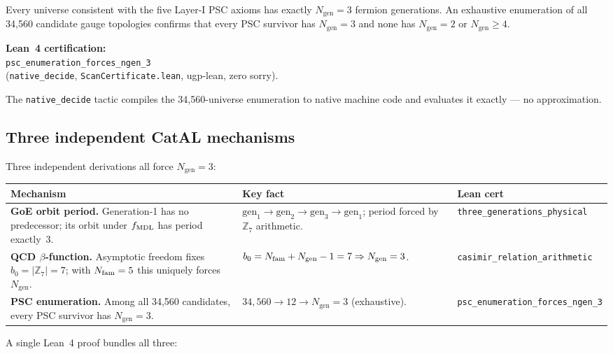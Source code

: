 \documentclass[11pt,a4paper]{article}
\newcommand{\lean}[1]{\texttt{#1}}
\newcommand{\ZS}{\mathbb{Z}_7}
\newcommand{\Ngen}{N_{\mathrm{gen}}}
\begin{document}
\begin{tcolorbox}[colback=boxpurple,colframe=purple!60!black,
  title={Theorem: Three-Generation Uniqueness (machine-certified)}]
Every universe consistent with the five Layer-I PSC axioms has exactly
$\Ngen = 3$ fermion generations.  An exhaustive enumeration of all 34,560
candidate gauge topologies confirms that every PSC survivor has $\Ngen = 3$
and none has $\Ngen = 2$ or $\Ngen \geq 4$.

\smallskip
\textbf{Lean~4 certification:}\\
\lean{psc\_enumeration\_forces\_ngen\_3}\\
(\lean{native\_decide}, \lean{ScanCertificate.lean}, ugp-lean, zero sorry).

The \lean{native\_decide} tactic compiles the 34,560-universe enumeration
to native machine code and evaluates it exactly --- no approximation.
\end{tcolorbox}

\subsection{Three independent CatAL mechanisms}

Three independent derivations all force $\Ngen = 3$:

\bigskip
\begin{center}
\small
\begin{tabular}{p{4.2cm}p{4.8cm}l}
\toprule
\textbf{Mechanism} & \textbf{Key fact} & \textbf{Lean cert} \\
\midrule
\textbf{GoE orbit period.}
Generation-1 has no predecessor; its orbit under $f_{\rm MDL}$
has period exactly~3. &
$\text{gen}_1 \to \text{gen}_2 \to \text{gen}_3 \to \text{gen}_1$;
period forced by $\ZS$ arithmetic. &
\lean{three\_generations\_physical} \\[8pt]
\textbf{QCD $\beta$-function.}
Asymptotic freedom fixes $b_0 = |\ZS| = 7$; with $N_{\rm fam}=5$ this
uniquely forces $\Ngen$. &
$b_0 = N_{\rm fam} + \Ngen - 1 = 7 \Rightarrow \Ngen = 3$. &
\lean{casimir\_relation\_arithmetic} \\[8pt]
\textbf{PSC enumeration.}
Among all 34,560 candidates, every PSC survivor has $\Ngen = 3$. &
$34{,}560 \to 12 \to \Ngen = 3$ (exhaustive). &
\lean{psc\_enumeration\_forces\_ngen\_3} \\
\bottomrule
\end{tabular}
\end{center}
\bigskip

A single Lean~4 proof bundles all three:
\end{document}
